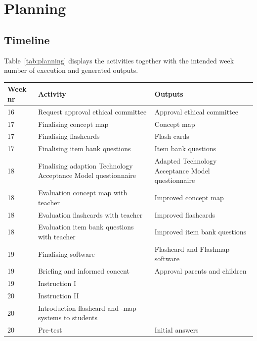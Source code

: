 \documentclass[11pt,twoside]{report} %
\begin{document}
\chapter{Planning}

\section{Timeline}


Table~\ref{tab:planning} displays the activities together with the intended week number of execution and generated outputs. 

\setcounter{table}{0}

\begin{table}
    \begin{tabular}{ l | p{} | p{}}
        \centering
        \textbf{Week nr} & \textbf{Activity} & \textbf{Outputs} \\ \hline
        16 & Request approval ethical committee & Approval ethical committee \\ \hline
        17 & Finalising concept map & Concept map \\ \hline
        17 & Finalising flashcards & Flash cards \\ \hline
        17 & Finalising item bank questions & Item bank questions \\ \hline
        18 & Finalising adaption Technology Acceptance Model questionnaire & Adapted Technology Acceptance Model questionnaire \\ \hline
        18 & Evaluation concept map with teacher & Improved concept map \\ \hline
        18 & Evaluation flashcards with teacher & Improved flashcards \\ \hline
        18 & Evaluation item bank questions with teacher & Improved item bank questions \\ \hline
        19 & Finalising software & Flashcard and Flashmap software \\ \hline
        19 & Briefing and informed concent & Approval parents and children \\ \hline
        19 & Instruction I & \\ \hline
        20 & Instruction II & \\ \hline
        20 & Introduction flashcard and -map systems to students & \\ \hline
        20 & Pre-test & Initial answers \\ \hline

\end{tabular}
\end{table}
\end{document}
